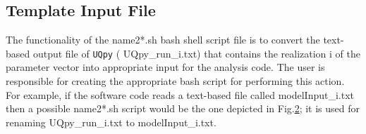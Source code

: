 \documentclass[preprint,12pt]{elsarticle}
\begin{document}
\begin{figure}[!ht]
	\caption{}
	\label{template_mcs}
\end{figure}



\subsection{Template Input File}

The functionality of the {\color{red} name2*.sh} bash shell script file is to convert the text-based output file of \texttt{UQpy}   ({\color{magenta} UQpy\_run\_i.txt}) that contains the realization {\color{magenta} i}  of the parameter vector into appropriate input  for the analysis code.  The user is responsible for creating the appropriate bash script for performing this action. For example, if the software code reads a text-based  file called {\color{magenta} modelInput\_i.txt} then a possible {\color{red} name2*.sh} script would be the one depicted in Fig.\ref{template_input};  it is used for renaming {\color{magenta} UQpy\_run\_i.txt } to {\color{magenta} modelInput\_i.txt}.


\begin{figure}[!ht]
	\caption{}
	\label{template_input}
\end{figure}
\end{document}
